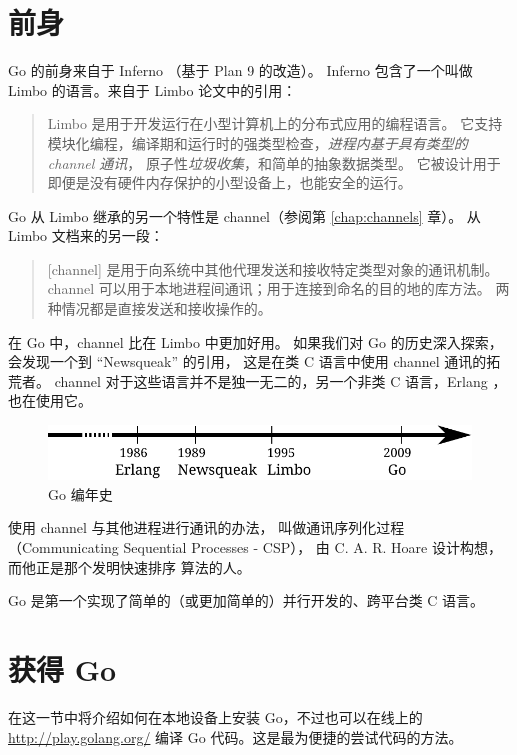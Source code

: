 \section{前身}
Go 的前身来自于 Inferno \cite{inferno} （基于 Plan 9 \cite{plan9} 的改造）。
Inferno 包含了一个叫做 Limbo \cite{limbo} 的语言。来自于 Limbo 论文中的引用：
\begin{quote}
Limbo 是用于开发运行在小型计算机上的分布式应用的编程语言。
它支持模块化编程，编译期和运行时的强类型检查，\emph{进程内基于具有类型的 channel 通讯}，
原子性\emph{垃圾收集}，和简单的抽象数据类型。
它被设计用于即便是没有硬件内存保护的小型设备上，也能安全的运行。
\end{quote}
Go 从 Limbo 继承的另一个特性是 channel（参阅第 \ref{chap:channels} 章）。
从 Limbo 文档来的另一段：
\begin{quote}
[channel] 是用于向系统中其他代理发送和接收特定类型对象的通讯机制。
channel 可以用于本地进程间通讯；用于连接到命名的目的地的库方法。
两种情况都是直接发送和接收操作的。
\end{quote}
在 Go 中，channel 比在 Limbo 中更加好用。
如果我们对 Go 的历史深入探索，会发现一个到 ``Newsqueak'' \cite{newsqueak} 的引用，
这是在类 C 语言中使用 channel 通讯的拓荒者。
channel 对于这些语言并不是独一无二的，另一个非类 C 语言，Erlang \cite{erlang}，也在使用它。

\begin{figure}[H]
\caption{Go 编年史}
\label{fig:chrono-of-go}
\begin{center}
\includegraphics[scale=0.65]{fig/go-history.pdf}
\end{center}
\end{figure}

使用 channel 与其他进程进行通讯的办法，
叫做通讯序列化过程（Communicating Sequential Processes - CSP），
由 C. A. R. Hoare \cite{hoare} 设计构想，而他正是那个发明快速排序 \cite{quicksort} 算法的人。

\begin{lbar}[]
Go 是第一个实现了简单的（或更加简单的）并行开发的、跨平台类 C 语言。
\end{lbar}

\section{获得 Go}
在这一节中将介绍如何在本地设备上安装 Go，不过也可以在线上的 \url{http://play.golang.org/} 编译 Go 代码。这是最为便捷的尝试代码的方法。

